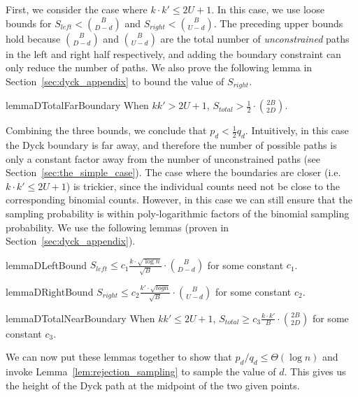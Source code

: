 First, we consider the case where $k\cdot k'\le 2U+1$.
In this case, we use loose bounds for $S_{left} < \binom{B}{D-d}$ and $S_{right} < \binom{B}{U-d}$.
The preceding upper bounds hold because $\binom{B}{D-d}$ and $\binom{B}{U-d}$ are the total number of \emph{unconstrained} paths
in the left and right half respectively, and adding the boundary constraint can only reduce the number of paths.
We also prove the following lemma in Section~\ref{sec:dyck_appendix} to bound the value of $S_{right}$.
\begin{restatable}{lemma}{DTotalFarBoundary}
\label{lem:DTotalFarBoundary}
When $kk' > 2U + 1$, $S_{total} > \frac 12\cdot \binom{2B}{2D}$.
\end{restatable}

Combining the three bounds, we conclude that $p_d < \frac 12 q_d$.
Intuitively, in this case the Dyck boundary is far away, and therefore the number of possible paths
is only a constant factor away from the number of unconstrained paths (see Section~\ref{sec:the_simple_case}).
The case where the boundaries are closer (i.e. $k\cdot k' \le 2U+1$) is trickier,
since the individual counts need not be close to the corresponding binomial counts.
However, in this case we can still ensure that the sampling probability is within poly-logarithmic factors of the binomial sampling probability.
We use the following lemmas (proven in Section~\ref{sec:dyck_appendix}).

\begin{restatable}{lemma}{DLeftBound}
\label{lem:DLeftBound}
$S_{left} \le c_1 \frac{ k\cdot\sqrt{\log n}}{\sqrt{B}}\cdot{{B}\choose{D-d}}$ for some constant $c_1$.
\end{restatable}

\begin{restatable}{lemma}{DRightBound}
\label{lem:DRightBound}
$S_{right} \le c_2 \frac{k'\cdot \sqrt{log n}}{\sqrt{B}}\cdot{{B}\choose{U-d}}$ for some constant $c_2$.
\end{restatable}

\begin{restatable}{lemma}{DTotalNearBoundary}
\label{lem:DTotalNearBoundary}
When $kk' \le 2U + 1$, $S_{total} \ge c_3 \frac{k\cdot k'}{B}\cdot{{2B}\choose{2D}}$ for some constant $c_3$.
\end{restatable}

We can now put these lemmas together to show that $p_d/q_d \le \Theta(\log n)$ and invoke Lemma~\ref{lem:rejection_sampling} to sample the value of $d$.
This gives us the height of the Dyck path at the midpoint of the two given points.

